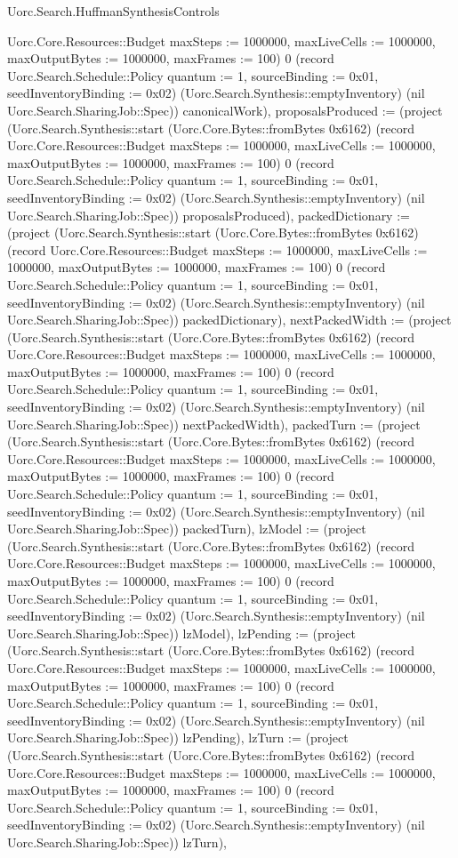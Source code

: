 \begin{lexlean}{Uorc.Search.HuffmanSynthesisControls}
\begin{semanticmodule}
{Uorc.Core.Resources::Budget {maxSteps := 1000000, maxLiveCells := 1000000, maxOutputBytes := 1000000, maxFrames := 100}) 0 (record Uorc.Search.Schedule::Policy {quantum := 1, sourceBinding := 0x01, seedInventoryBinding := 0x02}) (Uorc.Search.Synthesis::emptyInventory) (nil Uorc.Search.SharingJob::Spec)) canonicalWork), proposalsProduced := (project (Uorc.Search.Synthesis::start (Uorc.Core.Bytes::fromBytes 0x6162) (record Uorc.Core.Resources::Budget {maxSteps := 1000000, maxLiveCells := 1000000, maxOutputBytes := 1000000, maxFrames := 100}) 0 (record Uorc.Search.Schedule::Policy {quantum := 1, sourceBinding := 0x01, seedInventoryBinding := 0x02}) (Uorc.Search.Synthesis::emptyInventory) (nil Uorc.Search.SharingJob::Spec)) proposalsProduced), packedDictionary := (project (Uorc.Search.Synthesis::start (Uorc.Core.Bytes::fromBytes 0x6162) (record Uorc.Core.Resources::Budget {maxSteps := 1000000, maxLiveCells := 1000000, maxOutputBytes := 1000000, maxFrames := 100}) 0 (record Uorc.Search.Schedule::Policy {quantum := 1, sourceBinding := 0x01, seedInventoryBinding := 0x02}) (Uorc.Search.Synthesis::emptyInventory) (nil Uorc.Search.SharingJob::Spec)) packedDictionary), nextPackedWidth := (project (Uorc.Search.Synthesis::start (Uorc.Core.Bytes::fromBytes 0x6162) (record Uorc.Core.Resources::Budget {maxSteps := 1000000, maxLiveCells := 1000000, maxOutputBytes := 1000000, maxFrames := 100}) 0 (record Uorc.Search.Schedule::Policy {quantum := 1, sourceBinding := 0x01, seedInventoryBinding := 0x02}) (Uorc.Search.Synthesis::emptyInventory) (nil Uorc.Search.SharingJob::Spec)) nextPackedWidth), packedTurn := (project (Uorc.Search.Synthesis::start (Uorc.Core.Bytes::fromBytes 0x6162) (record Uorc.Core.Resources::Budget {maxSteps := 1000000, maxLiveCells := 1000000, maxOutputBytes := 1000000, maxFrames := 100}) 0 (record Uorc.Search.Schedule::Policy {quantum := 1, sourceBinding := 0x01, seedInventoryBinding := 0x02}) (Uorc.Search.Synthesis::emptyInventory) (nil Uorc.Search.SharingJob::Spec)) packedTurn), lzModel := (project (Uorc.Search.Synthesis::start (Uorc.Core.Bytes::fromBytes 0x6162) (record Uorc.Core.Resources::Budget {maxSteps := 1000000, maxLiveCells := 1000000, maxOutputBytes := 1000000, maxFrames := 100}) 0 (record Uorc.Search.Schedule::Policy {quantum := 1, sourceBinding := 0x01, seedInventoryBinding := 0x02}) (Uorc.Search.Synthesis::emptyInventory) (nil Uorc.Search.SharingJob::Spec)) lzModel), lzPending := (project (Uorc.Search.Synthesis::start (Uorc.Core.Bytes::fromBytes 0x6162) (record Uorc.Core.Resources::Budget {maxSteps := 1000000, maxLiveCells := 1000000, maxOutputBytes := 1000000, maxFrames := 100}) 0 (record Uorc.Search.Schedule::Policy {quantum := 1, sourceBinding := 0x01, seedInventoryBinding := 0x02}) (Uorc.Search.Synthesis::emptyInventory) (nil Uorc.Search.SharingJob::Spec)) lzPending), lzTurn := (project (Uorc.Search.Synthesis::start (Uorc.Core.Bytes::fromBytes 0x6162) (record Uorc.Core.Resources::Budget {maxSteps := 1000000, maxLiveCells := 1000000, maxOutputBytes := 1000000, maxFrames := 100}) 0 (record Uorc.Search.Schedule::Policy {quantum := 1, sourceBinding := 0x01, seedInventoryBinding := 0x02}) (Uorc.Search.Synthesis::emptyInventory) (nil Uorc.Search.SharingJob::Spec)) lzTurn), }
\end{semanticmodule}
\end{lexlean}

